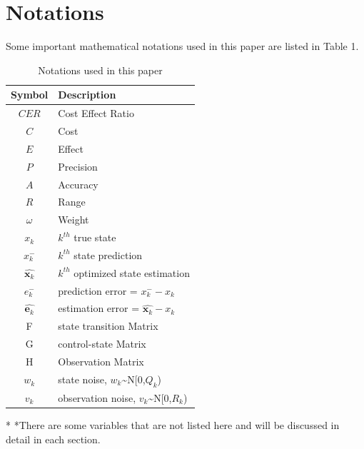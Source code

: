 \documentclass[12pt]{article}  %
\begin{document}
\section{Notations} %
Some important mathematical notations used in this paper are listed in Table 1. 
\begin{table}[htbp]
\begin{center}
\caption{Notations used in this paper}
\begin{tabular}{c l}
\toprule[2pt]
\multicolumn{1}{m{3cm}}{\centering Symbol}
&\multicolumn{1}{m{8cm}}{\centering Description }\\
\midrule
$CER$& Cost Effect Ratio \\
$C$& Cost \\
$E$& Effect \\
$P$& Precision \\
$A$& Accuracy \\
$R$& Range \\
$\omega$& Weight\\
$x_k$ & $k^{th}$ true state\\
$x^-_k$ & $k^{th}$ state prediction \\
\vspace{5pt}%
$\hat{\mathbf{x}_k}$ & $k^{th}$ optimized state estimation\\
\vspace{3pt}
$e^-_k$ & prediction error = $x^-_k-x_k$\\
$\hat{\mathbf{e}_k}$ & estimation error = $\hat{\mathbf{x}_k}-x_k$\\
F & state transition Matrix\\
G & control-state Matrix\\
H & Observation Matrix\\
$w_k$ & state noise, $w_k$\textasciitilde N[0,$Q_k$)\\
$v_k$ & observation noise, $v_k$\textasciitilde N[0,$R_k$)\\

\bottomrule[2pt]
\end{tabular}\label{tb:notation}
 \begin{tablenotes}
        \footnotesize
        \item[*] *There are some variables that are not listed here and will be discussed in detail in each section. %
      \end{tablenotes}
\end{center}
\end{table}
\vspace{-1cm}%
\end{document}
